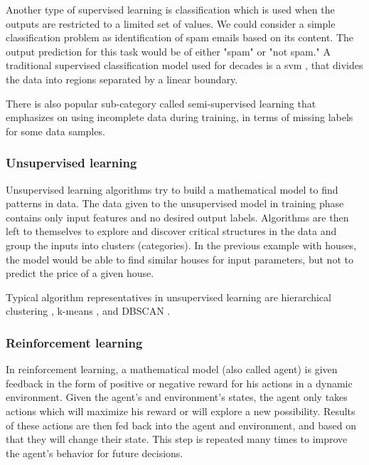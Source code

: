             Another type of supervised learning is classification which is used when the outputs are restricted to a limited set of values. We could consider a simple classification problem as identification of spam emails based on its content. The output prediction for this task would be of either "spam" or "not spam." A traditional supervised classification model used for decades is a \gls{svm} \cite{cortes1995support}, that divides the data into regions separated by a linear boundary. 
            
            There is also popular sub-category called semi-supervised learning that emphasizes on using incomplete data during training, in terms of missing labels for some data samples.
         
        \subsubsection{Unsupervised learning}
            Unsupervised learning algorithms try to build a mathematical model to find patterns in data. The data given to the unsupervised model in training phase contains only input features and no desired output labels. Algorithms are then left to themselves to explore and discover critical structures in the data and group the inputs into clusters (categories). In the previous example with houses, the model would be able to find similar houses for input parameters, but not to predict the price of a given house.
            
            Typical algorithm representatives in unsupervised learning are hierarchical clustering \cite{johnson1967hierarchical}, k-means \cite{macqueen1967some}, and DBSCAN \cite{ester1996density}.

            
        \subsubsection{Reinforcement learning}
            In reinforcement learning, a mathematical model (also called agent) is given feedback in the form of positive or negative reward for his actions in a dynamic environment. Given the agent's and environment's states, the agent only takes actions which will maximize his reward or will explore a new possibility. Results of these actions are then fed back into the agent and environment, and based on that they will change their state. This step is repeated many times to improve the agent's behavior for future decisions. 
            
